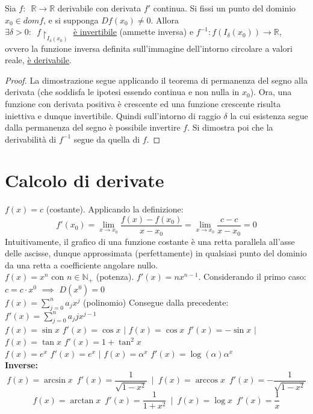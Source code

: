 \documentclass[10pt, oneside]{book}
\theoremstyle{plain}
\begin{document}
\begin{ther}
Sia $f : \enspace \mathbb{R} \rightarrow \mathbb{R}$ derivabile con derivata $f'$ continua. Si fissi un punto del dominio $x_0 \in dom f$, e si supponga $D f (x_0) \neq 0$. Allora\\
$\exists \delta > 0 : \enspace f\restriction_{I_\delta(x_0)}$ \underline{è invertibile} (ammette inversa) e $f^{-1} : f( I_\delta(x_0)) \rightarrow \mathbb{R}$, ovvero la funzione inversa definita sull'immagine dell'intorno circolare a valori reale, \underline{è derivabile}.
\end{ther}
\begin{proof}
La dimostrazione segue applicando il teorema di permanenza del segno alla derivata (che soddisfa le ipotesi essendo continua e non nulla in $x_0$). Ora, una funzione con derivata positiva è crescente ed una funzione crescente risulta iniettiva e dunque invertibile. Quindi sull'intorno di raggio $\delta$ la cui esistenza segue dalla permanenza del segno è possibile invertire $f$. Si dimostra poi che la derivabilità di $f^{-1}$ segue da quella di $f$.
\end{proof}

\section{Calcolo di derivate}
$f(x) = c$ (costante). Applicando la definizione:
    \[f'(x_0) = \lim \limits_{x \rightarrow x_0} \frac{f(x) - f(x_0)}{x - x_0} = \lim \limits_{x \rightarrow x_0} \frac{c - c}{x - x_0} = 0\]
    Intuitivamente, il grafico di una funzione costante è una retta parallela all'asse delle ascisse, dunque approssimata (perfettamente) in qualsiasi punto del dominio da una retta a coefficiente angolare nullo.
    \\$f(x) = x^n$ con $n \in \mathbb{N}_+$ (potenza). $f'(x) = n x^{n-1}$. Considerando il primo caso: $c = c \cdot x^0$ $\implies$ $D(x^0) = 0$
    \\$f(x) = \sum \limits_{j = 0}^{n} a_j x^j$ (polinomio) Consegue dalla precedente: $f'(x) = \sum \limits_{j = 0}^{n} a_j j x^{j-1}$
    \\\hfill $f(x) = \sin x$ $f'(x) = \cos x$ \hfill $\bigg|$ \hfill $f(x) = \cos x$ $f'(x) = -\sin x$ \hfill $\bigg|$ \hfill $f(x) = \tan x$ $f'(x) = 1 + \tan^2 x$ \hfill
    \\\hfill $f(x) = e^x$ $f'(x) = e^x$ \hfill $\bigg|$ \hfill $f(x) = \alpha^x$ $f'(x) = \log(\alpha) \alpha^x$ \hfill
    \\\textbf{Inverse:}
    \[f(x) = \arcsin x \enspace f'(x) = \frac{1}{\sqrt{1 - x^2}} \enspace \bigg| \enspace f(x) = \arccos x \enspace f'(x) = - \frac{1}{\sqrt{1 - x^2}}\]
    \[f(x) = \arctan x \enspace f'(x) = \frac{1}{1 + x^2} \enspace \bigg| \enspace f(x) = \log x \enspace f'(x) = \frac{1}{x}\]
\end{document}
